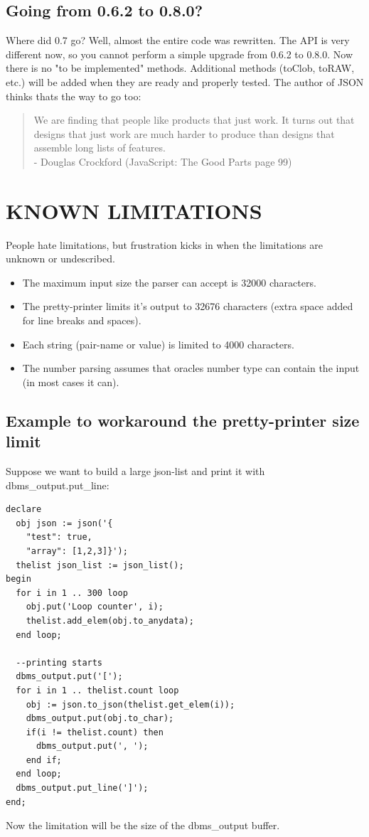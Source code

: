 \documentclass[11pt,twocolumn, a4paper]{article}
\begin{document}
\subsection*{Going from 0.6.2 to 0.8.0?}
Where did 0.7 go? Well, almost the entire code was rewritten. The API is very different now, so you cannot perform a simple upgrade from 0.6.2 to 0.8.0. Now there is no "to be implemented" methods. Additional methods (toClob, toRAW, etc.) will be added when they are ready and properly tested. The author of JSON thinks thats the way to go too: 
\begin{quotation}
We are finding that people like products that just work. It turns out that designs that just work are much harder to produce than designs that assemble long lists of features.\\ - Douglas Crockford (JavaScript: The Good Parts page 99)
\end{quotation}

\section*{KNOWN LIMITATIONS}
People hate limitations, but frustration kicks in when the limitations are unknown or undescribed. 
\begin{itemize}
\item The maximum input size the parser can accept is 32000 characters.
\item The pretty-printer limits it's output to 32676 characters (extra space added for line breaks and spaces).
\item Each string (pair-name or value) is limited to 4000 characters.
\item The number parsing assumes that oracles number type can contain the input (in most cases it can).
\end {itemize}

\subsection*{Example to workaround the pretty-printer size limit}
Suppose we want to build a large json-list and print it with dbms\_output.put\_line:
\small
\begin{verbatim}
declare
  obj json := json('{ 
    "test": true, 
    "array": [1,2,3]}');
  thelist json_list := json_list();
begin
  for i in 1 .. 300 loop
    obj.put('Loop counter', i);
    thelist.add_elem(obj.to_anydata);
  end loop;

  --printing starts
  dbms_output.put('[');
  for i in 1 .. thelist.count loop
    obj := json.to_json(thelist.get_elem(i));
    dbms_output.put(obj.to_char);
    if(i != thelist.count) then 
      dbms_output.put(', '); 
    end if;
  end loop;
  dbms_output.put_line(']');
end;
\end{verbatim}
\normalsize
Now the limitation will be the size of the dbms\_output buffer.
\end{document}
